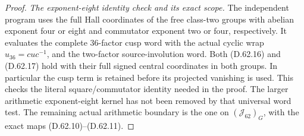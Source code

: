 \begin{proof}
\emph{The exponent-eight identity check and its exact scope.}
The independent program
uses the full Hall coordinates of
the free class-two groups with
abelian exponent four or eight
and commutator exponent two or
four, respectively. It evaluates
the complete 36-factor cusp word
with the actual cyclic wrap
\(u_{36}=cuc^{-1}\), and the
two-factor source-involution word.
Both (D.62.16) and (D.62.17) hold
with their full signed central
coordinates in both groups.
In particular the cusp term is
retained before its projected
vanishing is used. This checks
the literal square/commutator
identity needed in the proof.
The larger arithmetic
exponent-eight kernel has not
been removed by that universal
word test. The remaining actual
arithmetic boundary is the one
on \((\mathcal J_{62})_G\), with
the exact maps (D.62.10)--(D.62.11).
\end{proof}
